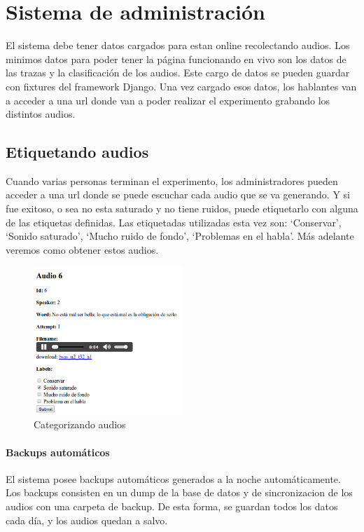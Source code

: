 \documentclass[11pt,a4paper,twoside]{tesis}
\begin{document}
\section{Sistema de administración}

El sistema debe tener datos cargados para estan online recolectando audios. Los minimos datos para poder tener la página funcionando en vivo son los datos de las trazas y la clasificación de los audios. Este cargo de datos se pueden guardar con fixtures del framework Django. Una vez cargado esos datos, los hablantes van a acceder a una url donde van a poder realizar el experimento grabando los distintos audios.

\subsection{Etiquetando audios}

Cuando varias personas terminan el experimento, los administradores pueden acceder a una url donde se puede escuchar cada audio que se va generando. Y si fue exitoso, o sea no esta saturado y no tiene ruidos, puede etiquetarlo con alguna de las etiquetas definidas. Las etiquetadas utilizadas esta vez son: ‘Conservar’,  ‘Sonido saturado’, ‘Mucho ruido de fondo’, ‘Problemas en el habla’. Más adelante veremos como obtener estos audios.

\begin{figure}[h!]
    \centerline{\includegraphics[width=0.5\textwidth]{categorizando_audios} }
    \caption{Categorizando audios}
\end{figure}

\paragraph{Backups automáticos}

El sistema posee backups automáticos generados a la noche automáticamente. Los backups consisten en un dump de la base de datos y de sincronizacion de los audios con una carpeta de backup. De esta forma, se guardan todos los datos cada día, y los audios quedan a salvo.
\end{document}
